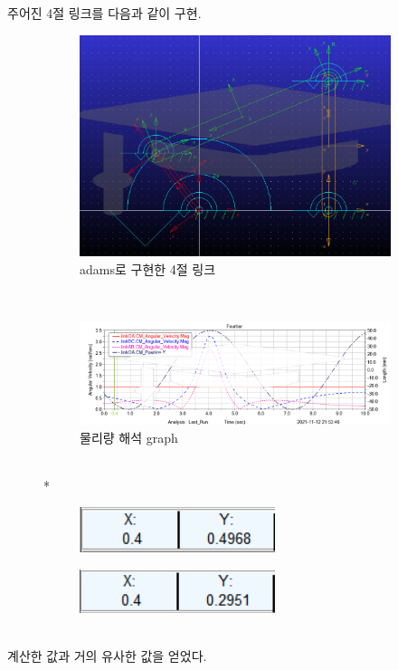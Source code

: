 \documentclass{article}
\begin{document}
주어진 4절 링크를 다음과 같이 구현.\\
\begin{figure}[h]
\begin{subfigure}{\textwidth}
  \centering
  \includegraphics[width=.9\linewidth]{fourbar.PNG}  
  \caption{adams로 구현한 4절 링크}
  \label{fig:sub-first}
 \end{subfigure}\\
 \begin{subfigure}{\textwidth}
  \centering
  \includegraphics[width=.9\linewidth]{graph.PNG}  
  \caption{물리량 해석 graph}
  \label{fig:sub-first}
 \end{subfigure}\\*
\begin{subfigure}{.5\textwidth}
  \centering
  \includegraphics[width=.8\linewidth]{result2.PNG}  
  \label{fig:sub-first}
 \end{subfigure}
 \begin{subfigure}{.5\textwidth}
  \centering
  \includegraphics[width=.8\linewidth]{result1.PNG}  
  \label{fig:sub-first}
 \end{subfigure}
\end{figure}\\
 계산한 값과 거의 유사한 값을 얻었다.
\pagebreak
\end{document}
